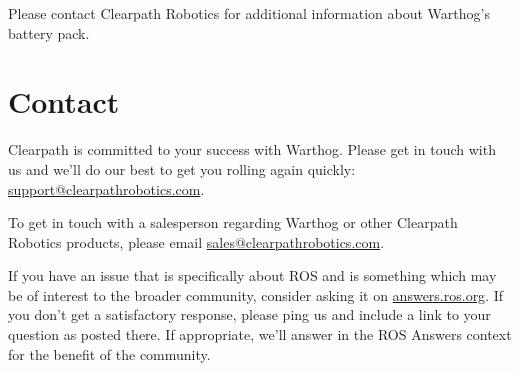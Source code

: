 \documentclass[]{clearpath-latex/clearpath-manual}
\begin{document}
Please contact Clearpath Robotics for additional information about Warthog's battery pack.


\section{Contact}
\label{contact}

Clearpath is committed to your success with Warthog. Please get in touch with us and we’ll do our best to get
you rolling again quickly: \url{support@clearpathrobotics.com}.

To get in touch with a salesperson regarding Warthog or other Clearpath Robotics products, please email
\url{sales@clearpathrobotics.com}.

If you have an issue that is specifically about ROS and is something which may be of interest to the broader
community, consider asking it on \url{answers.ros.org}. If you don’t get a satisfactory response, please ping us and
include a link to your question as posted there. If appropriate, we’ll answer in the ROS Answers context for
the benefit of the community.

\appendix

\thispagestyle{empty}

\thispagestyle{empty}
\end{document}

